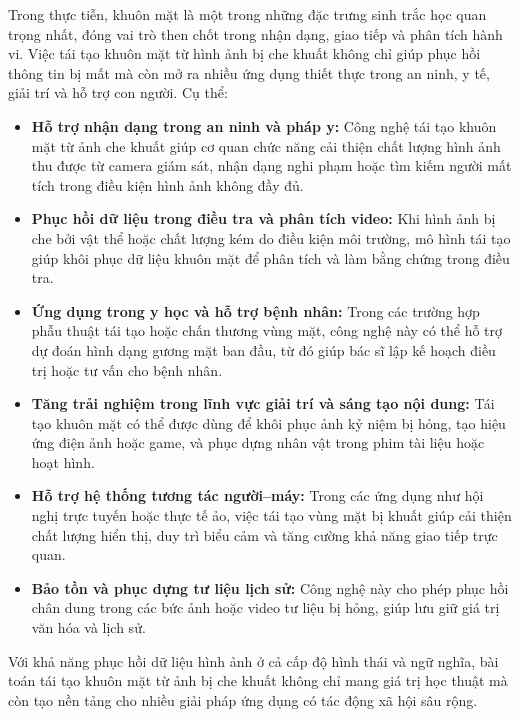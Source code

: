 \documentclass[12pt,a4paper]{article}
\begin{document}
	Trong thực tiễn, khuôn mặt là một trong những đặc trưng sinh trắc học quan trọng nhất, đóng vai trò then chốt trong nhận dạng, giao tiếp và phân tích hành vi. Việc tái tạo khuôn mặt từ hình ảnh bị che khuất không chỉ giúp phục hồi thông tin bị mất mà còn mở ra nhiều ứng dụng thiết thực trong an ninh, y tế, giải trí và hỗ trợ con người. Cụ thể:
	\begin{itemize}
		\item \textbf{Hỗ trợ nhận dạng trong an ninh và pháp y:} Công nghệ tái tạo khuôn mặt từ ảnh che khuất giúp cơ quan chức năng cải thiện chất lượng hình ảnh thu được từ camera giám sát, nhận dạng nghi phạm hoặc tìm kiếm người mất tích trong điều kiện hình ảnh không đầy đủ.
		
		\item \textbf{Phục hồi dữ liệu trong điều tra và phân tích video:} Khi hình ảnh bị che bởi vật thể hoặc chất lượng kém do điều kiện môi trường, mô hình tái tạo giúp khôi phục dữ liệu khuôn mặt để phân tích và làm bằng chứng trong điều tra.  
		
		\item \textbf{Ứng dụng trong y học và hỗ trợ bệnh nhân:} Trong các trường hợp phẫu thuật tái tạo hoặc chấn thương vùng mặt, công nghệ này có thể hỗ trợ dự đoán hình dạng gương mặt ban đầu, từ đó giúp bác sĩ lập kế hoạch điều trị hoặc tư vấn cho bệnh nhân.  
		
		\item \textbf{Tăng trải nghiệm trong lĩnh vực giải trí và sáng tạo nội dung:} Tái tạo khuôn mặt có thể được dùng để khôi phục ảnh kỷ niệm bị hỏng, tạo hiệu ứng điện ảnh hoặc game, và phục dựng nhân vật trong phim tài liệu hoặc hoạt hình.  
		
		\item \textbf{Hỗ trợ hệ thống tương tác người–máy:} Trong các ứng dụng như hội nghị trực tuyến hoặc thực tế ảo, việc tái tạo vùng mặt bị khuất giúp cải thiện chất lượng hiển thị, duy trì biểu cảm và tăng cường khả năng giao tiếp trực quan.  
		
		\item \textbf{Bảo tồn và phục dựng tư liệu lịch sử:} Công nghệ này cho phép phục hồi chân dung trong các bức ảnh hoặc video tư liệu bị hỏng, giúp lưu giữ giá trị văn hóa và lịch sử.  
	\end{itemize}
	
	Với khả năng phục hồi dữ liệu hình ảnh ở cả cấp độ hình thái và ngữ nghĩa, bài toán tái tạo khuôn mặt từ ảnh bị che khuất không chỉ mang giá trị học thuật mà còn tạo nền tảng cho nhiều giải pháp ứng dụng có tác động xã hội sâu rộng.
	
\end{document}
